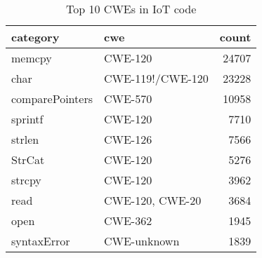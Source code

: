\begin{table}
\caption{Top 10 CWEs in IoT code}
\begin{tabular}{llr}
\toprule
category & cwe & count \\
\midrule
memcpy & CWE-120 & 24707 \\
char & CWE-119!/CWE-120 & 23228 \\
comparePointers & CWE-570 & 10958 \\
sprintf & CWE-120 & 7710 \\
strlen & CWE-126 & 7566 \\
StrCat & CWE-120 & 5276 \\
strcpy & CWE-120 & 3962 \\
read & CWE-120, CWE-20 & 3684 \\
open & CWE-362 & 1945 \\
syntaxError & CWE-unknown & 1839 \\
\bottomrule
\end{tabular}
\end{table}
